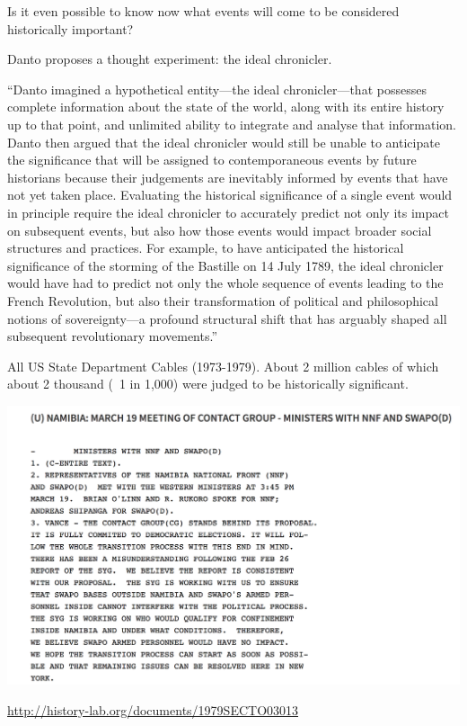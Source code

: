 \documentclass[aspectratio=169]{beamer}
\begin{document}
\begin{frame}
{Is it even possible to know now what events will come to be considered historically important?

Danto proposes a thought experiment: the ideal chronicler.

``Danto imagined a hypothetical entity—the ideal chronicler—that possesses complete information about the state of the world, along with its entire history up to that point, and unlimited ability to integrate and analyse that information. Danto then argued that the ideal chronicler would still be unable to anticipate the significance that will be assigned to contemporaneous events by future historians because their judgements are inevitably informed by events that have not yet taken place. Evaluating the historical significance of a single event would in principle require the ideal chronicler to accurately predict not only its impact on subsequent events, but also how those events would impact broader social structures and practices. For example, to have anticipated the historical significance of the storming of the Bastille on 14 July 1789, the ideal chronicler would have had to predict not only the whole sequence of events leading to the French Revolution, but also their transformation of political and philosophical notions of sovereignty—a profound structural shift that has arguably shaped all subsequent revolutionary movements.''

}
\end{frame}
\begin{frame}

All US State Department Cables (1973-1979). About 2 million cables of which about 2 thousand (~1 in 1,000) were judged to be historically significant.
\pause

\begin{center}
\includegraphics[height=0.5\textheight]{figures/cable_1979SECTO03013}
\end{center}

\vfill

\tiny{\url{http://history-lab.org/documents/1979SECTO03013}}

\end{frame}
\end{document}
